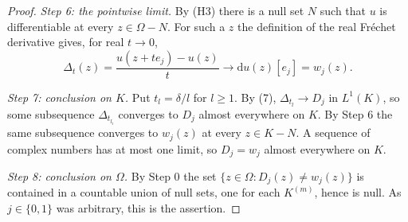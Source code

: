 \begin{proof}
\emph{Step 6: the pointwise limit.}  By (H3) there is a null set $N$ such that
$u$ is differentiable at every $z\in\Omega-N$.  For such a $z$ the definition
of the real Fr\'echet derivative gives, for real $t\to0$,
\[
  \Delta_t(z)=\frac{u(z+te_j)-u(z)}{t}\longrightarrow
  \mathrm{d}u(z)[e_j]=w_j(z).
\]

\emph{Step 7: conclusion on $K$.}  Put $t_l=\delta/l$ for $l\ge1$.  By (7),
$\Delta_{t_l}\to D_j$ in $L^{1}(K)$, so some subsequence
$\Delta_{t_{l_i}}$ converges to $D_j$ almost everywhere on $K$.  By Step 6 the
same subsequence converges to $w_j(z)$ at every $z\in K-N$.  A sequence of
complex numbers has at most one limit, so $D_j=w_j$ almost everywhere on $K$.

\emph{Step 8: conclusion on $\Omega$.}  By Step 0 the set
$\{z\in\Omega:D_j(z)\neq w_j(z)\}$ is contained in a countable union of null
sets, one for each $K^{(m)}$, hence is null.  As $j\in\{0,1\}$ was arbitrary,
this is the assertion.
\end{proof}
